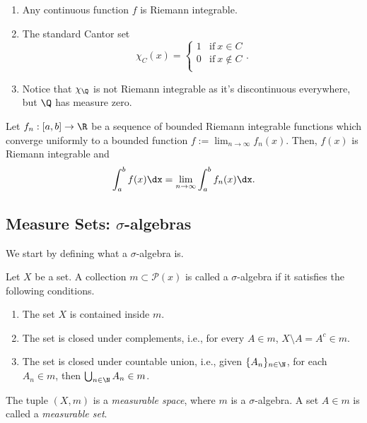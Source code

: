 \begin{examples}\leavevmode
  \begin{enumerate}
    \item Any continuous function $f$ is Riemann integrable.
    \item The standard Cantor set
      \[%
        \chi_C(x) = \begin{cases}
          1 & \text{if}~x \in C \\
          0 & \text{if}~x \not\in C \\
        \end{cases}
      .\]%
    \item Notice that $\chi_\Q$ is not Riemann integrable as it's discontinuous everywhere, but $\Q$ has measure zero.
  \end{enumerate}
\end{examples}

\begin{theorem}
  Let $f_n : [a, b] \to \R$ be a sequence of bounded Riemann integrable functions which converge uniformly to a bounded function $f := \lim_{n \to \infty} f_n(x)$. Then, $f(x)$ is Riemann integrable and
  \[%
    \int_a^b f(x) \dx = \lim_{n \to \infty} \int_a^b f_n(x) \dx
  .\]%
\end{theorem}

\subsection{Measure Sets: $\sigma$-algebras}

We start by defining what a $\sigma$-algebra is.

\begin{definition}
  Let $X$ be a set.
  A collection $m \subset \mathcal{P}(x)$ is called a $\sigma$-algebra if it satisfies the following conditions.
  \begin{enumerate}
    \item The set $X$ is contained inside $m$.
    \item The set is closed under complements, i.e., for every $A \in m$, $X \setminus A = A^c \in m$.
    \item The set is closed under countable union, i.e., given $\{A_n\}_{n\in\N}$, for each $A_n \in m$, then $\bigcup_{n\in\N} A_n \in m$.
  \end{enumerate}
  The tuple $(X, m)$ is a \emph{measurable space}, where $m$ is a $\sigma$-algebra. A set $A \in m$ is called a \emph{measurable set}.
\end{definition}


